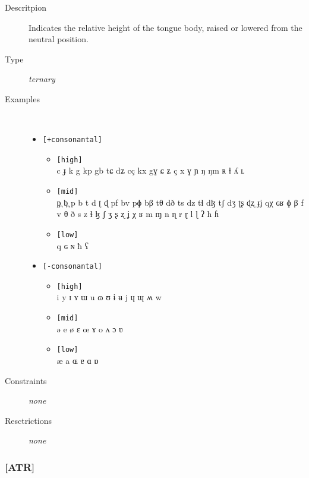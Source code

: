 \documentclass[10pt,letterpaper]{article}
\begin{document}
\begin{description}
\item[Descritpion] Indicates the relative height of the tongue body, raised or lowered from the neutral position.
\item[Type] \emph{ternary}
\item[Examples]\
  \begin{itemize}
    \item \texttt{[+consonantal]}
    \begin{itemize}
      \item \texttt{[high]}\\
      c ɟ k g kp gb tɕ dʑ cç kx gɣ ɕ ʑ ç x ɣ ɲ ŋ ŋm ʀ ɫ ʎ ʟ 
      \item \texttt{[mid]}\\
      p̪ b̪ p b t d ʈ ɖ pf bv pɸ bβ tθ dð ts dz tɬ dɮ tʃ dʒ ʈʂ ɖʐ ɟʝ qχ ɢʁ ɸ β f v θ ð s z ɬ ɮ ʃ ʒ ʂ ʐ ʝ χ ʁ m ɱ n ɳ r ɽ l ɭ ʔ h ɦ 
      \item \texttt{[low]}\\
      q ɢ ɴ ħ ʕ 
    \end{itemize}
    \item  \texttt{[-consonantal]}
    \begin{itemize}
      \item \texttt{[high]}\\
      i y ɪ ʏ ɯ u ɷ ʊ ɨ ʉ j ɥ ɰ ʍ w 
      \item \texttt{[mid]}\\
      ə e ø ɛ œ ɤ o ʌ ɔ ʋ 
      \item \texttt{[low]}\\
      æ a ɶ ɐ ɑ ɒ 
    \end{itemize}
  \end{itemize}
\item[Constraints] \emph{none}
\item[Resctrictions] \emph{none}
\end{description}

\subsubsection{[ATR]}
\label{ssub:feature_atr}
\end{document}
